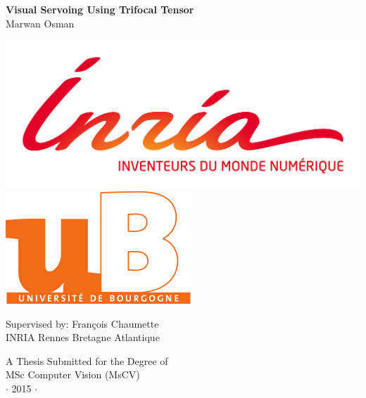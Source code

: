 \newpage
\thispagestyle{empty}


\vspace*{2cm}
\begin{center}
{\huge\bf Visual Servoing Using Trifocal Tensor\\} \vspace{2cm} {\large
Marwan Osman\\ }
\vspace{3cm}

\includegraphics[height=0.1\textheight]{figures/inrialogo.jpg}
\includegraphics[height=0.1\textheight]{figures/ublogo.png}

\vspace{1cm}
Supervised by: Fran\c{c}ois Chaumette\\
INRIA Rennes Bretagne Atlantique
\end{center}

\vspace{4cm}
\begin{center}
{\large A Thesis Submitted for the Degree of \\MSc Computer Vision (MsCV) \\\vspace{0.3cm} $\cdot$ 2015 $\cdot$}
\end{center}
\singlespacing



